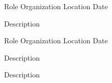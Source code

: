 \begin{cventries}
  \cventry
    {Role} %
    {Organization} %
    {Location} %
    {Date} %
    {
      \begin{cvitems} %
        \item {Description}
      \end{cvitems}
    }

  \cventry
    {Role} %
    {Organization} %
    {Location} %
    {Date} %
    {
      \begin{cvitems} %
        \item {Description}
        \item {Description}
      \end{cvitems}
    }

\end{cventries}

